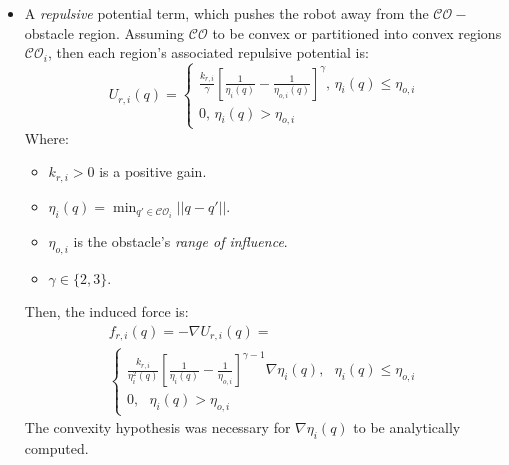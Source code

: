 \begin{itemize}
\begin{itemize}
                                            However note that this is not defined at the target configuration and the robot converges more slowly to the target than with the other choice. However, this force doesn't go to infinity for large errors $e(q)$, so it is useful for starting configurations.
                                    \end{itemize}
                                \item A \textit{repulsive} potential term, which pushes the robot away from the $\mathcal{CO}-$obstacle region. Assuming $\mathcal{CO}$ to be convex or partitioned into convex regions $\mathcal{CO}_i$, then each region's associated repulsive potential is:
                                \begin{equation}\label{repulsive_potential}
                                    U_{r,i}(q)=
                                    \begin{cases}
                                        \frac{k_{r,i}}{\gamma} \left[\frac{1}{\eta_i(q)}-\frac{1}{\eta_{o,i}(q)}\right]^\gamma \text{, } \eta_i(q)\leq \eta_{o,i} \\
                                        0 \text{, } \eta_{i}(q)>\eta_{o,i}
                                    \end{cases}
                                \end{equation}
                                Where: 
                                \begin{itemize}
                                    \item $k_{r,i}>0$ is a positive gain.
                                    \item $\eta_i(q)=\min_{q'\in \mathcal{CO}_{i}}||q-q'||$.
                                    \item $\eta_{o,i}$ is the obstacle's \textit{range of influence}.
                                    \item $\gamma \in \{2,3\}$.
                                \end{itemize}
                                Then, the induced force is:
                                \begin{gather*}
                                    f_{r,i}(q)=- \nabla U_{r,i}(q)= \\
                                    \begin{cases}
                                        \frac{k_{r,i}}{\eta_{i}^{2}(q)} \left[\frac{1}{\eta_{i}(q)}-\frac{1}{\eta_{o,i}}\right]^{\gamma-1} \nabla\eta_i(q), \text{ }\eta_i(q) \leq \eta_{o,i} \\
                                        0, \text{ } \eta_i(q)>\eta_{o,i}
                                    \end{cases}
                                \end{gather*}
                                The convexity hypothesis was necessary for $\nabla \eta_i(q)$ to be analytically computed.
                            \end{itemize}
